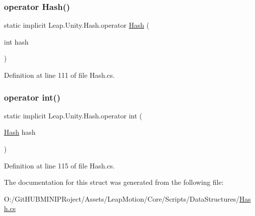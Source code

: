 \mbox{\label{struct_leap_1_1_unity_1_1_hash_a038bce1286e011a879e995b1e094d138}} 
\subsubsection{\texorpdfstring{operator Hash()}{operator Hash()}}
{\footnotesize\ttfamily static implicit Leap.\+Unity.\+Hash.\+operator \mbox{\hyperlink{struct_leap_1_1_unity_1_1_hash}{Hash}} (\begin{DoxyParamCaption}\item[{int}]{hash }\end{DoxyParamCaption})\hspace{0.3cm}{\ttfamily [static]}}



Definition at line 111 of file Hash.\+cs.

\mbox{\label{struct_leap_1_1_unity_1_1_hash_a85fa52543cbef6d3ee6e5cbd58e05da9}} 
\subsubsection{\texorpdfstring{operator int()}{operator int()}}
{\footnotesize\ttfamily static implicit Leap.\+Unity.\+Hash.\+operator int (\begin{DoxyParamCaption}\item[{\mbox{\hyperlink{struct_leap_1_1_unity_1_1_hash}{Hash}}}]{hash }\end{DoxyParamCaption})\hspace{0.3cm}{\ttfamily [static]}}



Definition at line 115 of file Hash.\+cs.



The documentation for this struct was generated from the following file\+:\begin{DoxyCompactItemize}
\item 
O\+:/\+Git\+H\+U\+B\+M\+I\+N\+I\+P\+Roject/\+Assets/\+Leap\+Motion/\+Core/\+Scripts/\+Data\+Structures/\mbox{\hyperlink{_hash_8cs}{Hash.\+cs}}\end{DoxyCompactItemize}
